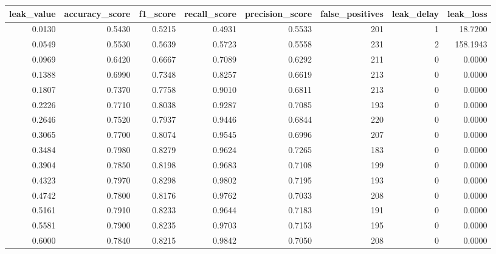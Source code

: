 \begin{tabular}{rrrrrrrr}
\toprule
leak\_value & accuracy\_score & f1\_score & recall\_score & precision\_score & false\_positives & leak\_delay & leak\_loss \\
\midrule
0.0130 & 0.5430 & 0.5215 & 0.4931 & 0.5533 & 201 & 1 & 18.7200 \\
0.0549 & 0.5530 & 0.5639 & 0.5723 & 0.5558 & 231 & 2 & 158.1943 \\
0.0969 & 0.6420 & 0.6667 & 0.7089 & 0.6292 & 211 & 0 & 0.0000 \\
0.1388 & 0.6990 & 0.7348 & 0.8257 & 0.6619 & 213 & 0 & 0.0000 \\
0.1807 & 0.7370 & 0.7758 & 0.9010 & 0.6811 & 213 & 0 & 0.0000 \\
0.2226 & 0.7710 & 0.8038 & 0.9287 & 0.7085 & 193 & 0 & 0.0000 \\
0.2646 & 0.7520 & 0.7937 & 0.9446 & 0.6844 & 220 & 0 & 0.0000 \\
0.3065 & 0.7700 & 0.8074 & 0.9545 & 0.6996 & 207 & 0 & 0.0000 \\
0.3484 & 0.7980 & 0.8279 & 0.9624 & 0.7265 & 183 & 0 & 0.0000 \\
0.3904 & 0.7850 & 0.8198 & 0.9683 & 0.7108 & 199 & 0 & 0.0000 \\
0.4323 & 0.7970 & 0.8298 & 0.9802 & 0.7195 & 193 & 0 & 0.0000 \\
0.4742 & 0.7800 & 0.8176 & 0.9762 & 0.7033 & 208 & 0 & 0.0000 \\
0.5161 & 0.7910 & 0.8233 & 0.9644 & 0.7183 & 191 & 0 & 0.0000 \\
0.5581 & 0.7900 & 0.8235 & 0.9703 & 0.7153 & 195 & 0 & 0.0000 \\
0.6000 & 0.7840 & 0.8215 & 0.9842 & 0.7050 & 208 & 0 & 0.0000 \\
\bottomrule
\end{tabular}

